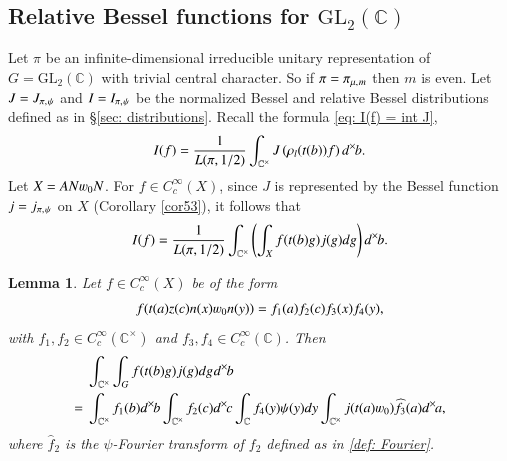 \documentclass{amsproc}
\newcommand{\BC}{{\mathbb {C}}} \newcommand{\BD}{{\mathbb {D}}}
\newcommand{\GL}{{\mathrm {GL}}} \newcommand{\PGL}{{\mathrm {PGL}}}
\def\lp {\left (}
\def\rp {\right )}
\def\BCx{\BC^{\times}}
\def\shskip{\hskip 0.5 pt}
\def\dx{d^{\times} \hskip -1 pt}
\theoremstyle{plain}
\newtheorem{lem}[thm]{Lemma}  \newtheorem{prop}[thm]{Proposition}
\numberwithin{equation}{section}
\newcommand{\red}[1]{\textcolor{red}{#1}}
\begin{document}
	
	\subsection{Relative Bessel functions for  $\GL_2 (\BC)$}
	Let $\pi$ be an infinite-dimensional irreducible unitary representation of $G = \GL_2 (\BC)$ with trivial central character. So if $\pi = \pi_{\mu, \shskip  m}$ then $m$ is even. Let $J = J_{\pi, \shskip \psi}$ and $I = I_{\pi, \shskip \psi}$ be the normalized Bessel and relative Bessel distributions defined as in \S \ref{sec: distributions}. Recall the formula \eqref{eq: I(f) = int J},
	\begin{align*}
	 I  (f) = \frac 1 {L (\pi, 1/2)} \int_{\BCx} J  \lp \rho_{l} (t(b)) f \rp \dx  b.
	\end{align*}
	Let $X = A N \varw_0 N$. For $f \in C_c^{\infty} (X)$,   since $ J  $ is represented by the Bessel function $j = j_{\pi, \shskip \psi} $ on $X$ (Corollary \ref{cor53}), it follows  that
	\begin{align}\label{6eq: I = int}
	I  (f) = \frac 1 {L (\pi, 1/2)} \int_{\BCx} \lp \int_{X}  f(t(b)g) j  (g) dg \rp \dx  b .
	\end{align}
	
	\begin{lem}\label{6lem: rel Bessel for split f}
		Let $f \in C_c^{\infty} (X)$ be of the form
		\begin{align}\label{6eq: f splits}
		f (t(a) z(c) n(x) \varw_0 n(y)) = f_1 (a) f_2 (c) f_3 (x) f_4 (y),
		\end{align}
		with $f_1,  f_2 \in  C_c^{\infty}  (\BCx)$ and $f_3, f_4 \in C_c^{\infty}  (\BC)$. Then
		\begin{equation}\label{6eq: double int for I}
		\begin{split}
		& \int_{\BCx}    \int_{G}  f(t(b)g) j  (g) dg \shskip   \dx  b \\
		 = \ & \int_{\BCx} f_1 (b) \dx  b \int_{\BCx} f_2 (c) \dx  c  \int_{\BC}   f_4 (y ) \psi (y) d y \int_{\BCx} j  (t(a) \varw_0) \widehat f_3 (a) \dx  a,
		\end{split}
		\end{equation}
		where $ \widehat f_2 $ is the $\psi$-Fourier transform of $f_2$   defined as in  \eqref{def: Fourier}.
	\end{lem}
\end{document}
